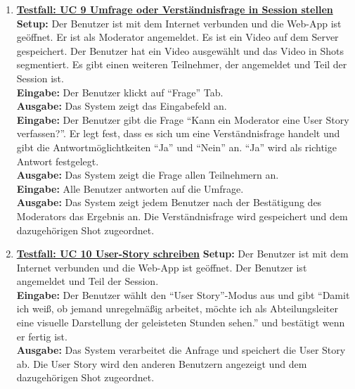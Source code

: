 \begin{enumerate}
	\item \underline{\textbf{Testfall: UC 9 Umfrage oder Verständnisfrage in Session stellen}} \linebreak
	\textbf{Setup:} Der Benutzer ist mit dem Internet verbunden und die Web-App ist geöffnet. Er ist als Moderator angemeldet. Es ist ein Video auf dem Server gespeichert. Der Benutzer hat ein Video ausgewählt und das Video in Shots segmentiert. Es gibt einen weiteren Teilnehmer, der angemeldet und Teil der Session ist.\\
	\textbf{Eingabe:} Der Benutzer klickt auf ``Frage'' Tab. \\
	\textbf{Ausgabe:} Das System zeigt das Eingabefeld an.\\ 
	\textbf{Eingabe:} Der Benutzer gibt die Frage ``Kann ein Moderator eine User Story verfassen?''. Er legt fest, dass es sich um eine Verständnisfrage handelt und gibt die Antwortmöglichtkeiten ``Ja'' und ``Nein'' an. ``Ja'' wird als richtige Antwort festgelegt.\\
	\textbf{Ausgabe:} Das System zeigt die Frage allen Teilnehmern an.\\ 
	\textbf{Eingabe:} Alle Benutzer antworten auf die Umfrage. \\
	\textbf{Ausgabe:} Das System zeigt jedem Benutzer nach der Bestätigung des Moderators das Ergebnis an. Die Verständnisfrage wird gespeichert und dem dazugehörigen Shot zugeordnet. \\
	
	\item \underline{\textbf{Testfall: UC 10 User-Story schreiben}} \linebreak
	\textbf{Setup:} Der Benutzer ist mit dem Internet verbunden und die Web-App ist geöffnet. Der Benutzer ist angemeldet und Teil der Session.\\
	\textbf{Eingabe:} Der Benutzer wählt den ``User Story''-Modus aus und gibt ``Damit ich weiß, ob jemand unregelmäßig arbeitet, möchte ich als Abteilungsleiter eine visuelle Darstellung der geleisteten Stunden sehen.'' und bestätigt wenn er fertig ist.\\
	\textbf{Ausgabe:} Das System verarbeitet die Anfrage und speichert die User Story ab. Die User Story wird den anderen Benutzern angezeigt und dem dazugehörigen Shot zugeordnet.\linebreak \linebreak
	

\end{enumerate}
